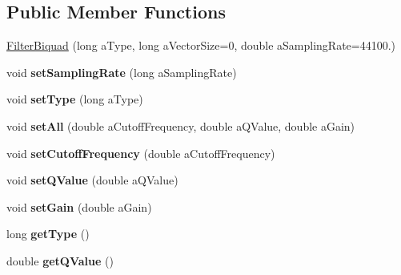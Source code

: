 \subsection*{Public Member Functions}
\begin{DoxyCompactItemize}
\item 
\hyperlink{class_filter_biquad_a9a504b833a433b8577a41b521b717b21}{Filter\-Biquad} (long a\-Type, long a\-Vector\-Size=0, double a\-Sampling\-Rate=44100.)
\item 
\hypertarget{class_filter_biquad_a321faeeacbe9896e47b377b23d74637d}{void {\bfseries set\-Sampling\-Rate} (long a\-Sampling\-Rate)}\label{class_filter_biquad_a321faeeacbe9896e47b377b23d74637d}

\item 
\hypertarget{class_filter_biquad_ac0ba3ef15154149523b071a4a314112d}{void {\bfseries set\-Type} (long a\-Type)}\label{class_filter_biquad_ac0ba3ef15154149523b071a4a314112d}

\item 
\hypertarget{class_filter_biquad_af91ac10594525c676cb47a159239e466}{void {\bfseries set\-All} (double a\-Cutoff\-Frequency, double a\-Q\-Value, double a\-Gain)}\label{class_filter_biquad_af91ac10594525c676cb47a159239e466}

\item 
\hypertarget{class_filter_biquad_ae3c1fdf80fd3621cefb7362082add267}{void {\bfseries set\-Cutoff\-Frequency} (double a\-Cutoff\-Frequency)}\label{class_filter_biquad_ae3c1fdf80fd3621cefb7362082add267}

\item 
\hypertarget{class_filter_biquad_a35f3317cdef03dd351a4a9401dff74c0}{void {\bfseries set\-Q\-Value} (double a\-Q\-Value)}\label{class_filter_biquad_a35f3317cdef03dd351a4a9401dff74c0}

\item 
\hypertarget{class_filter_biquad_a4d43410d2a3f408d20167ab930bbf5d8}{void {\bfseries set\-Gain} (double a\-Gain)}\label{class_filter_biquad_a4d43410d2a3f408d20167ab930bbf5d8}

\item 
\hypertarget{class_filter_biquad_a2f0de4d82960ede2e3c90ce09ffa40d1}{long {\bfseries get\-Type} ()}\label{class_filter_biquad_a2f0de4d82960ede2e3c90ce09ffa40d1}

\item 
\hypertarget{class_filter_biquad_abafde4e1288c78428a670301dd04358c}{double {\bfseries get\-Q\-Value} ()}\label{class_filter_biquad_abafde4e1288c78428a670301dd04358c}


\end{DoxyCompactItemize}
